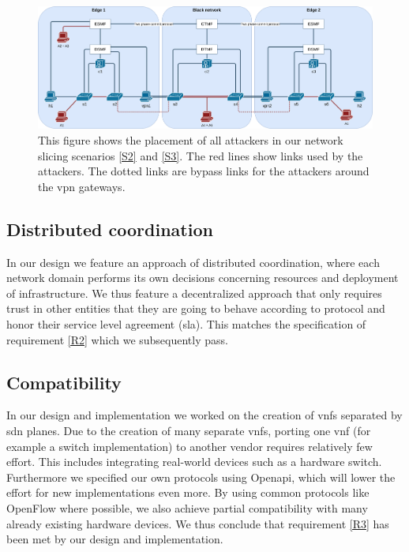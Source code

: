 \begin{landscape}
    \begin{figure}[ht]
        \centering
        \includegraphics[width=\linewidth]{images/chapter_7/attackers_topo.png}
        \caption[Placement of attackers in scenario S2 and S3]{This figure shows the placement of all attackers in our network slicing scenarios \ref{S2} and \ref{S3}. The red lines show links used by the attackers. The dotted links are bypass links for the attackers around the \acrshort{vpn} gateways.}
        \label{fig:attackers_topo}
    \end{figure}
\end{landscape}

\subsection{Distributed coordination}
In our design we feature an approach of distributed coordination, where each network domain performs its own decisions concerning resources and deployment of infrastructure. We thus feature a decentralized approach that only requires trust in other entities that they are going to behave according to protocol and honor their service level agreement (\acrshort{sla}). This matches the specification of requirement \ref{R2} which we subsequently pass.

\subsection{Compatibility}
In our design and implementation we worked on the creation of \acrshort{vnf}s separated by \acrshort{sdn} planes. Due to the creation of many separate \acrshort{vnf}s, porting one \acrshort{vnf} (for example a switch implementation) to another vendor requires relatively few effort. This includes integrating real-world devices such as a hardware switch. Furthermore we specified our own protocols using Open\acrshort{api}, which will lower the effort for new implementations even more. By using common protocols like OpenFlow where possible, we also achieve partial compatibility with many already existing hardware devices. We thus conclude that requirement \ref{R3} has been met by our design and implementation.

